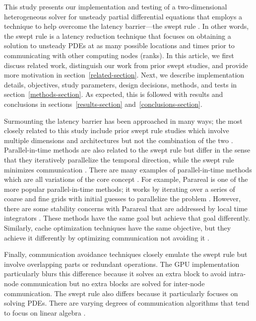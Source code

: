 \documentclass[preprints,article,accept,moreauthors,pdftex]{Definitions/mdpi}
\begin{document}
\par
   This study presents our implementation and testing of a two-dimensional heterogeneous solver for unsteady partial differential equations that employs a technique to help overcome the latency barrier---the swept rule \cite{Alhubail2016ThePDEs}. In other words, the swept rule is a latency reduction technique that focuses on obtaining a solution to unsteady PDEs at as many possible locations and times prior to communicating with other computing nodes (ranks). In this article, we first discuss related work, distinguish our work from prior swept studies, and provide more motivation in section~\ref{related-section}. Next, we describe implementation details, objectives, study parameters, design decisions, methods, and tests in section~\ref{methods-section}. As expected, this is followed with results and conclusions in sections~\ref{results-section} and~\ref{conclusions-section}.

\label{related-section}
\par Surmounting the latency barrier has been approached in many ways; the most closely related to this study include prior swept rule studies which involve multiple dimensions and architectures but not the combination of the two \cite{Alhubail2016ThePDEs,Alhubail2018ThePDEs,Magee2018AcceleratingDecomposition,Magee2020ApplyingSystems}. Parallel-in-time methods are also related to the swept rule but differ in the sense that they iteratively parallelize the temporal direction, while the swept rule minimizes communication \cite{Gander201550Integration}. There are many examples of parallel-in-time methods which are all variations of the core concept \cite{Falgout2014ParallelMultigrid,Lions2013Resolution,Maday2020AnAlgorithm,Wu2018Parareal,EmmettTowardEquations,MinionINTERWEAVINGMULTIGRID,Hahne2020PyMGRIT:MGRIT}. For example, Parareal is one of the more popular parallel-in-time methods; it works by iterating over a series of coarse and fine grids with initial guesses to parallelize the problem \cite{Lions2013Resolution}. However, there are some stability concerns with Parareal that are addressed by local time integrators \cite{Wu2018Parareal}. These methods have the same goal but achieve that goal differently. Similarly, cache optimization techniques have the same objective, but they achieve it differently by optimizing communication not avoiding it \cite{Kowarschik2003AnAlgorithms}.

\par
 Finally, communication avoidance techniques closely emulate the swept rule but involve overlapping parts or redundant operations. The GPU implementation particularly blurs this difference because it solves an extra block to avoid intra-node communication but no extra blocks are solved for inter-node communication. The swept rule also differs because it particularly focuses on solving PDEs. There are varying degrees of communication algorithms that tend to focus on linear algebra \cite{DemmelAvoidingComputations, Ballard2011MinimizingAlgebra,BaboulinAMachines,Khabou2012LUVersion,SolomonikAHoefler}. 
\end{document}
